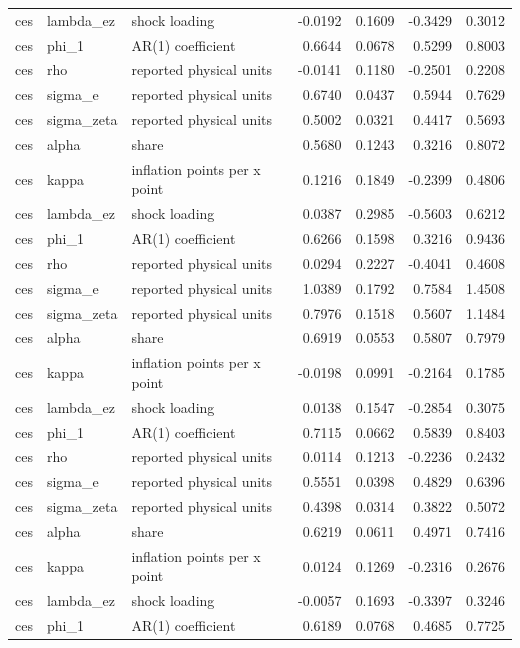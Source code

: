 \begin{tabular}{lllrrrr}
ces & lambda\_ez & shock loading & -0.0192 & 0.1609 & -0.3429 & 0.3012 \\
ces & phi\_1 & AR(1) coefficient & 0.6644 & 0.0678 & 0.5299 & 0.8003 \\
ces & rho & reported physical units & -0.0141 & 0.1180 & -0.2501 & 0.2208 \\
ces & sigma\_e & reported physical units & 0.6740 & 0.0437 & 0.5944 & 0.7629 \\
ces & sigma\_zeta & reported physical units & 0.5002 & 0.0321 & 0.4417 & 0.5693 \\
ces & alpha & share & 0.5680 & 0.1243 & 0.3216 & 0.8072 \\
ces & kappa & inflation points per x point & 0.1216 & 0.1849 & -0.2399 & 0.4806 \\
ces & lambda\_ez & shock loading & 0.0387 & 0.2985 & -0.5603 & 0.6212 \\
ces & phi\_1 & AR(1) coefficient & 0.6266 & 0.1598 & 0.3216 & 0.9436 \\
ces & rho & reported physical units & 0.0294 & 0.2227 & -0.4041 & 0.4608 \\
ces & sigma\_e & reported physical units & 1.0389 & 0.1792 & 0.7584 & 1.4508 \\
ces & sigma\_zeta & reported physical units & 0.7976 & 0.1518 & 0.5607 & 1.1484 \\
ces & alpha & share & 0.6919 & 0.0553 & 0.5807 & 0.7979 \\
ces & kappa & inflation points per x point & -0.0198 & 0.0991 & -0.2164 & 0.1785 \\
ces & lambda\_ez & shock loading & 0.0138 & 0.1547 & -0.2854 & 0.3075 \\
ces & phi\_1 & AR(1) coefficient & 0.7115 & 0.0662 & 0.5839 & 0.8403 \\
ces & rho & reported physical units & 0.0114 & 0.1213 & -0.2236 & 0.2432 \\
ces & sigma\_e & reported physical units & 0.5551 & 0.0398 & 0.4829 & 0.6396 \\
ces & sigma\_zeta & reported physical units & 0.4398 & 0.0314 & 0.3822 & 0.5072 \\
ces & alpha & share & 0.6219 & 0.0611 & 0.4971 & 0.7416 \\
ces & kappa & inflation points per x point & 0.0124 & 0.1269 & -0.2316 & 0.2676 \\
ces & lambda\_ez & shock loading & -0.0057 & 0.1693 & -0.3397 & 0.3246 \\
ces & phi\_1 & AR(1) coefficient & 0.6189 & 0.0768 & 0.4685 & 0.7725 \\

\end{tabular}
